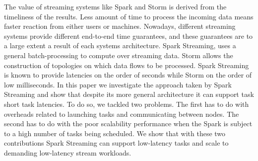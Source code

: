 \noindent The value of streaming systems like Spark and Storm is derived from the timeliness of the results. Less amount of time to process the incoming data means faster reaction from either users or machines. Nowadays, different streaming systems provide different end-to-end time guarantees, and these guarantees are to a large extent a result of each systems architecture. Spark Streaming, uses a general batch-processing to compute over streaming data. Storm allows the construction of topologies on which data flows to be processed. Spark Streaming is known to provide latencies on the order of seconds while Storm on the order of low milliseconds. In this paper we investigate the approach taken by Spark Streaming and show that despite its more general architecture it can support task short task latencies. To do so, we tackled two problems. The first has to do with overheads related to launching tasks and communicating between nodes. The second has to do with the poor scalability performance when the Spark is subject to a high number of tasks being scheduled. We show that with these two contributions Spark Streaming can support low-latency tasks and scale to demanding low-latency stream workloads.


